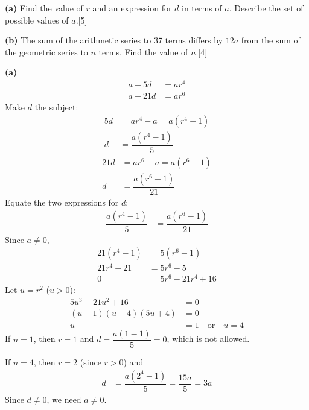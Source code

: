 \documentclass[a4paper,11pt,oneside]{article}
\newcommand{\partlabel}[1]{\par\needspace{3\baselineskip}\smallskip\noindent\textbf{#1}\quad}
\newcommand{\mk}[1]{\hfill[#1]}
\begin{document}
\partlabel{(a)}
Find the value of $r$ and an expression for $d$ in terms of $a$. Describe the set of possible values of $a$.\mk{5}



\partlabel{(b)}
The sum of the arithmetic series to 37 terms differs by $12a$ from the sum of the geometric series to $n$ terms. Find the value of $n$.\mk{4}

\begin{solbox}
\partlabel{(a)}
\begin{align*}
a + 5d &= ar^4\\
a + 21d &= ar^6
\end{align*}
Make $d$ the subject:
\begin{align*}
5d &= ar^4 - a = a(r^4 - 1)\\
d &= \dfrac{a(r^4 - 1)}{5}
\end{align*}
\begin{align*}
21d &= ar^6 - a = a(r^6 - 1)\\
d &= \dfrac{a(r^6 - 1)}{21}
\end{align*}
Equate the two expressions for $d$:
\begin{align*}
\dfrac{a(r^4 - 1)}{5} &= \dfrac{a(r^6 - 1)}{21}
\end{align*}
Since $a\neq 0$,
\begin{align*}
21(r^4 - 1) &= 5(r^6 - 1)\\
21r^4 - 21 &= 5r^6 - 5\\
0 &= 5r^6 - 21r^4 + 16
\end{align*}
Let $u=r^2$ ($u>0$):
\begin{align*}
5u^3 - 21u^2 + 16 &= 0\\
(u-1)(u-4)(5u+4) &= 0\\
u &= 1\quad\text{or}\quad u=4
\end{align*}
If $u=1$, then $r=1$ and $d=\dfrac{a(1-1)}{5}=0$, which is not allowed.

If $u=4$, then $r=2$ (since $r>0$) and
\begin{align*}
d &= \dfrac{a(2^4 - 1)}{5} = \dfrac{15a}{5} = 3a
\end{align*}
Since $d\neq 0$, we need $a\neq 0$.


\end{solbox}
\end{document}
